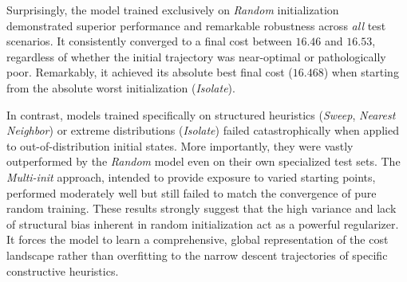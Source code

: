 \documentclass[letterpaper]{article} %
\begin{document}
Surprisingly, the model trained exclusively on \textit{Random} initialization demonstrated superior performance and remarkable robustness across \textit{all} test scenarios. It consistently converged to a final cost between $16.46$ and $16.53$, regardless of whether the initial trajectory was near-optimal or pathologically poor. Remarkably, it achieved its absolute best final cost ($16.468$) when starting from the absolute worst initialization (\textit{Isolate}). 

In contrast, models trained specifically on structured heuristics (\textit{Sweep}, \textit{Nearest Neighbor}) or extreme distributions (\textit{Isolate}) failed catastrophically when applied to out-of-distribution initial states. More importantly, they were vastly outperformed by the \textit{Random} model even on their own specialized test sets. The \textit{Multi-init} approach, intended to provide exposure to varied starting points, performed moderately well but still failed to match the convergence of pure random training. These results strongly suggest that the high variance and lack of structural bias inherent in random initialization act as a powerful regularizer. It forces the model to learn a comprehensive, global representation of the cost landscape rather than overfitting to the narrow descent trajectories of specific constructive heuristics.
\end{document}
